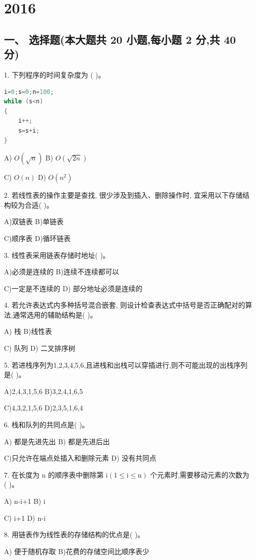 \chapter{2016}
\section*{一、 选择题(本大题共 20 小题,每小题 2 分,共 40 分)}

1. 下列程序的时间复杂度为 (   )。

\begin{lstlisting}[language=C, basicstyle=\ttfamily]
i=0;s=0;n=100;
while (s<n)
{
    i++;
    s=s+i;
}
\end{lstlisting}

A) \(O\left( \sqrt{n}\right)\) B) \(O\left( \sqrt{2n}\right)\)

C) \(O\left( n\right)\) D) \(O\left( {n}^{2}\right)\)

2. 若线性表的操作主要是查找, 很少涉及到插入、删除操作时, 宜采用以下存储结构较为合适(   )。

A)双链表 B)单链表

C)顺序表 D)循环链表

3. 线性表采用链表存储时地址(   )。

A)必须是连续的 B)连续不连续都可以

C)一定是不连续的 D) 部分地址必须是连续的

4. 若允许表达式内多种括号混合嵌套, 则设计检查表达式中括号是否正确配对的算法,通常选用的辅助结构是(   )。

A) 栈 B)线性表

C) 队列 D) 二叉排序树

5. 若进栈序列为1,2,3,4,5,6,且进栈和出栈可以穿插进行,则不可能出现的出栈序列是(   )。

A)2,4,3,1,5,6 B)3,2,4,1,6,5

C)4,3,2,1,5,6 D)2,3,5,1,6,4

6. 栈和队列的共同点是(   )。

A) 都是先进先出 B) 都是先进后出

C)只允许在端点处插入和删除元素 D) 没有共同点

7. 在长度为 \(\mathrm{n}\) 的顺序表中删除第 \(\mathrm{i}\left( {1 \leq  \mathrm{i} \leq  \mathrm{n}}\right)\) 个元素时,需要移动元素的次数为 (   )。

A) n-i+1 B) i

C) i+1 D) n-i

8. 用链表作为线性表的存储结构的优点是(   )。

A) 便于随机存取 B)花费的存储空间比顺序表少

